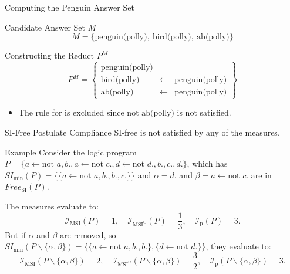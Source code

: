 \begin{frame}{Computing the Penguin Answer Set}
    \begin{block}{Candidate Answer Set \(M\)}
        \[
            M = \{\text{penguin(polly)},\ \text{bird(polly)},\ \text{ab(polly)}\}
        \]
    \end{block}
    \begin{block}{Constructing the Reduct \(P^M\)}
        \[
            P^M = \left\{
            \begin{array}{lcl}
                \text{penguin(polly)} &            &                       \\
                \text{bird(polly)}    & \leftarrow & \text{penguin(polly)} \\
                \text{ab(polly)}      & \leftarrow & \text{penguin(polly)}
            \end{array}
            \right\}
        \]
        \begin{itemize}
            \item The rule for  is excluded since \(\text{not }\text{ab(polly)}\) is not satisfied.
        \end{itemize}
    \end{block}
\end{frame}

\begin{frame}{SI-Free Postulate Compliance}
    SI-free is not satisfied by any of the measures.
    \begin{exampleblock}{Example}
        Consider the logic program \(P = \{a \leftarrow \text{not } a, b., a \leftarrow \text{not }c., d \leftarrow \text{not }d., b., c., d.\}\), which has \(SI_{\min}(P) = \{\{a \leftarrow \text{not }a, b., b., c.\}\}\)
        and \(\alpha = d.\) and \(\beta = a \leftarrow \text{not }c.\) are in \(Free_{\text{SI}}(P)\).

        The measures evaluate to:
        \[
            \mathcal{I}_{\text{MSI}}(P) = 1,\quad \mathcal{I}_{\text{MSI}^\text{C}}(P) = \frac{1}{3},\quad \mathcal{I}_{\text{p}}(P) = 3.
        \]
        But if \(\alpha\) and \(\beta\) are removed, so \(SI_{\min}(P \backslash \{\alpha,\beta\}) = \{\{a \leftarrow \text{not }a, b., b.\}, \{d \leftarrow \text{not }d.\}\}\), they evaluate to:
        \[
            \mathcal{I}_{\text{MSI}}(P \backslash \{\alpha,\beta\}) = 2,\quad \mathcal{I}_{\text{MSI}^\text{C}}(P \backslash \{\alpha,\beta\}) = \frac{3}{2},\quad \mathcal{I}_{\text{p}}(P \backslash \{\alpha,\beta\}) = 3.
        \]
    \end{exampleblock}
\end{frame}
